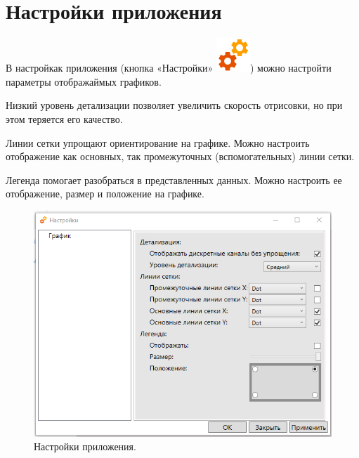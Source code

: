 \documentclass[a4paper,12pt]{article}
\begin{document}
\section*{\hspace{.5cm} Настройки приложения}
\hspace{.5cm} В настройкак приложения (кнопка «Настройки»  \includegraphics[width=4ex]{image/Services-48.png}) можно настройти параметры отображаймых графиков. 

Низкий уровень детализации позволяет увеличить скорость отрисовки, но при этом теряется его качество.

Линии сетки упрощают ориентирование на графике. Можно настроить отображение  как основных, так промежуточных (вспомогательных) линии сетки.

Легенда помогает разобраться в представленных данных. Можно настроить ее отображение, размер и положение на графике.

\begin{figure}[h]
\centering
\includegraphics[width=65ex]{image/Screenshot_5.png}
\caption{Настройки приложения.}
\end{figure}
\end{document}

